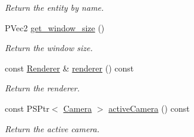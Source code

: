 \begin{DoxyCompactItemize}
\begin{DoxyCompactList}\small\item\em Return the entity by name. \end{DoxyCompactList}\item 
P\+Vec2 \mbox{\hyperlink{classprz_1_1_scene_a1740ae76f69941fd144c0bd2b676cbee}{get\+\_\+window\+\_\+size}} ()
\begin{DoxyCompactList}\small\item\em Return the window size. \end{DoxyCompactList}\item 
const \mbox{\hyperlink{classprz_1_1_renderer}{Renderer}} \& \mbox{\hyperlink{classprz_1_1_scene_a9b3d951d80efb66226155224fe63956b}{renderer}} () const
\begin{DoxyCompactList}\small\item\em Return the renderer. \end{DoxyCompactList}\item 
const P\+S\+Ptr$<$ \mbox{\hyperlink{classprz_1_1_camera}{Camera}} $>$ \mbox{\hyperlink{classprz_1_1_scene_a19077419381d6e278ca13abf7f8eb69c}{active\+Camera}} () const
\begin{DoxyCompactList}\small\item\em Return the active camera. \end{DoxyCompactList}\end{DoxyCompactItemize}
